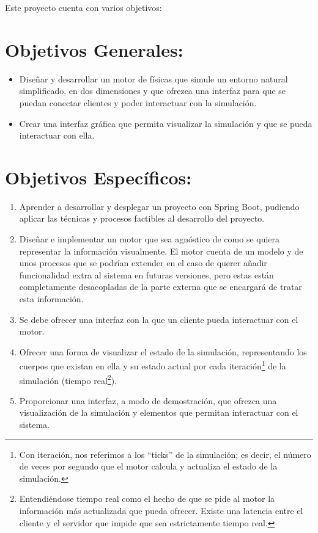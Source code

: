 
Este proyecto cuenta con varios objetivos: 

\section{Objetivos Generales:}

\begin{itemize}
    \item Diseñar y desarrollar un motor de físicas que simule un entorno natural simplificado, en dos dimensiones y que ofrezca una interfaz para que se puedan conectar clientes  y poder interactuar con la simulación.
    \item Crear una interfaz gráfica que permita visualizar la simulación y que se pueda interactuar con ella.
\end{itemize}

 
 \section{Objetivos Específicos:}
 
 
 \begin{enumerate}
     
     \item Aprender a desarrollar y desplegar un proyecto con Spring Boot, pudiendo aplicar las técnicas y procesos factibles al desarrollo del proyecto.
    
     \item Diseñar e implementar un motor que sea agnóstico de como se quiera representar la información visualmente. El motor cuenta de un modelo y de unos procesos que se podrían extender en el caso de querer añadir funcionalidad extra al sistema en futuras versiones, pero estas están completamente desacopladas de la parte externa que se encargará de tratar esta información.

    \item Se debe ofrecer una interfaz con la que un cliente pueda interactuar con el motor.
     
     \item Ofrecer una forma de visualizar el estado de la simulación, representando los cuerpos que existan en ella y su estado actual por cada iteración\footnote{Con iteración, nos referimos a los ``ticks'' de la simulación; es decir, el número de veces por segundo que el motor calcula y actualiza el estado de la simulación.} de la simulación (tiempo real\footnote{Entendiéndose tiempo real como el hecho de que se pide al motor la información más actualizada que pueda ofrecer. Existe una latencia entre el cliente y el servidor que impide que sea estrictamente tiempo real. }).
     
     \item Proporcionar una interfaz, a modo de demostración, que ofrezca una visualización de la simulación y elementos que permitan interactuar con el sistema.
     
 \end{enumerate}